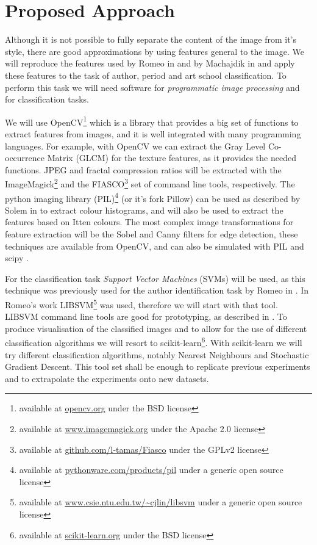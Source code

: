\documentclass[a4paper,twocolumn]{article}
\begin{document}
\section{Proposed Approach}

Although it is not possible to fully separate the content of the image from
it's style, there are good approximations by using features general to the
image.  We will reproduce the features used by Romeo in \cite{rmc12ajs} and by
Machajdik in \cite{mach10clas} and apply these features to the task of author,
period and art school classification.  To perform this task we will need
software for \emph{programmatic image processing} and for classification tasks.

We will use OpenCV\footnote{available at \href{http://opencv.org/}{opencv.org}
under the BSD license} which is a library that provides a big set of functions
to extract features from images, and it is well integrated with many
programming languages.  For example, with OpenCV we can extract the Gray Level
Co-occurrence Matrix (GLCM) for the texture features, as it provides the needed
functions.  JPEG and fractal compression ratios will be extracted with the
ImageMagick\footnote{available at
\href{http://www.imagemagick.org/}{www.imagemagick.org} under the Apache 2.0
license} and the FIASCO\footnote{available at
\href{http://github.com/l-tamas/Fiasco/}{github.com/l-tamas/Fiasco} under the
GPLv2 license} set of command line tools, respectively.  The python imaging
library (PIL)\footnote{available at
\href{http://pythonware.com/products/pil/}{pythonware.com/products/pil} under a
generic open source license} (or it's fork Pillow) can be used as described by
Solem in \cite{solem12book} to extract colour histograms, and will also be used
to extract the features based on Itten colours.  The most complex image
transformations for feature extraction will be the Sobel and Canny filters for
edge detection, these techniques are available from OpenCV, and can also be
simulated with PIL and scipy \cite{oliphant06numpy}.

For the classification task \emph{Support Vector Machines} (SVMs) will be used,
as this technique was previously used for the author identification task by
Romeo in \cite{rmc12ajs}.  In Romeo's work LIBSVM\footnote{available at
\href{http://www.csie.ntu.edu.tw/~cjlin/libsvm/}
{www.csie.ntu.edu.tw/\~{}cjlin/libsvm} under a generic open source license} was
used, therefore we will start with that tool.  LIBSVM command line tools are
good for prototyping, as described in \cite{hcl03svm}.  To produce
visualisation of the classified images and to allow for the use of different
classification algorithms we will resort to scikit-learn\footnote{available at
\href{http://scikit-learn.org/}{scikit-learn.org} under the BSD license}.  With
scikit-learn we will try different classification algorithms, notably Nearest
Neighbours and Stochastic Gradient Descent.  This tool set shall be enough to
replicate previous experiments and to extrapolate the experiments onto new
datasets.
\end{document}
